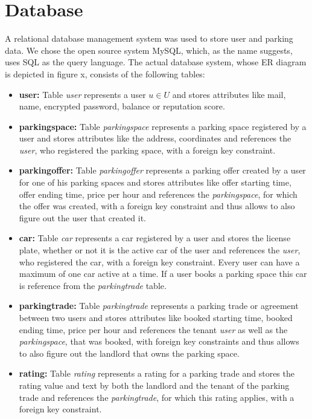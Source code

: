 \section{Database}
A relational database management system was used to store user and parking data. We chose the open source system MySQL, which, as the name suggests, uses SQL as the query language. The actual database system, whose ER diagram is depicted in figure x, consists of the following tables:
\begin{itemize}
\item \textbf{user:} Table \textit{user} represents a user $u \in U$ and stores attributes like mail, name, encrypted password, balance or reputation score.
\item \textbf{parkingspace:} Table \textit{parkingspace} represents a parking space registered by a user and stores attributes like the address, coordinates and references the \textit{user}, who registered the parking space, with a foreign key constraint.
\item \textbf{parkingoffer:} Table \textit{parkingoffer} represents a parking offer created by a user for one of his parking spaces and stores attributes like offer starting time, offer ending time, price per hour and references the \textit{parkingspace}, for which the  offer was created, with a foreign key constraint and thus allows to also figure out the user that created it.
\item \textbf{car:} Table \textit{car} represents a car registered by a user and stores the license plate, whether or not it is the active car of the user and references the \textit{user}, who registered the car, with a foreign key constraint. Every user can have a maximum of one car active at a time. If a user books a parking space this car is reference from the \textit{parkingtrade} table.
\item \textbf{parkingtrade:} Table \textit{parkingtrade} represents a parking trade or agreement between two users and stores attributes like booked starting time, booked ending time, price per hour and references the tenant \textit{user} as well as the \textit{parkingspace}, that was booked, with foreign key constraints and thus allows to also figure out the landlord that owns the parking space.
\item \textbf{rating:} Table \textit{rating} represents a rating for a parking trade and stores the rating value and text by both the landlord and the tenant of the parking trade and references the \textit{parkingtrade}, for which this rating applies, with a foreign key constraint.

\end{itemize}

